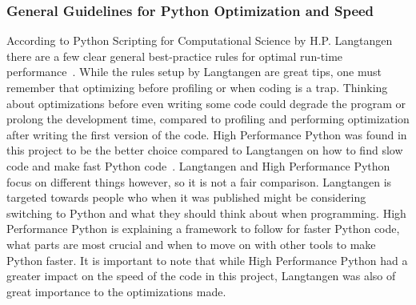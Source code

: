 \documentclass[12pt, a4paper]{article}
\begin{document}
\subsubsection{General Guidelines for Python Optimization and Speed}

According to Python Scripting for Computational Science by H.P. Langtangen there are a few clear general best-practice rules for optimal run-time performance~\cite{pythonBook}.
While the rules setup by Langtangen are great tips, one must remember that optimizing before profiling or when coding is a trap.
Thinking about optimizations before even writing some code could degrade the program or prolong the development time, compared to profiling and performing optimization after writing the first version of the code.
High Performance Python was found in this project to be the better choice compared to Langtangen on how to find slow code and make fast Python code~\cite{oreilly}.
Langtangen and High Performance Python focus on different things however, so it is not a fair comparison.
Langtangen is targeted towards people who when it was published might be considering switching to Python and what they should think about when programming.
High Performance Python is explaining a framework to follow for faster Python code, what parts are most crucial and when to move on with other tools to make Python faster.
It is important to note that while High Performance Python had a greater impact on the speed of the code in this project, Langtangen was also of great importance to the optimizations made.
\end{document}

